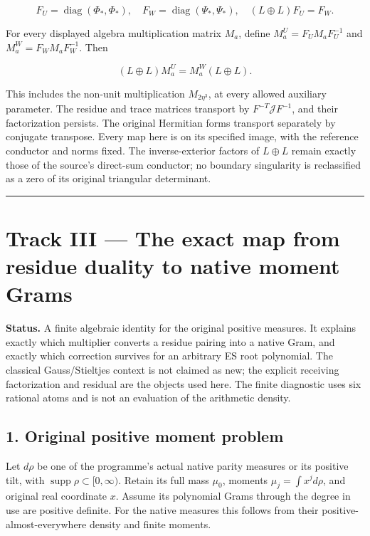 \[
 F_U=\operatorname{diag}(\Phi_*,\Phi_*),\quad
 F_W=\operatorname{diag}(\Psi_*,\Psi_*),\quad
 (L\oplus L)F_U=F_W.
\]

For every displayed algebra multiplication matrix \(M_a\), define
\(M_a^U=F_U M_a F_U^{-1}\) and \(M_a^W=F_W M_a F_W^{-1}\). Then

\[
 (L\oplus L)M_a^U=M_a^W(L\oplus L).
\]

This includes the non-unit multiplication \(M_{2\eta^3}\), at every
allowed auxiliary parameter. The residue and trace matrices transport by
\(F^{-T}\mathcal JF^{-1}\), and their factorization persists. The
original Hermitian forms transport separately by conjugate transpose.
Every map here is on its specified image, with the reference conductor
and norms fixed. The inverse-exterior factors of \(L\oplus L\) remain
exactly those of the source's direct-sum conductor; no boundary
singularity is reclassified as a zero of its original triangular
determinant.

\begin{center}\rule{0.5\linewidth}{0.5pt}\end{center}

\section{Track III --- The exact map from residue duality to native
moment
Grams}\label{track-iii-the-exact-map-from-residue-duality-to-native-moment-grams}

\textbf{Status.} A finite algebraic identity for the original positive
measures. It explains exactly which multiplier converts a residue
pairing into a native Gram, and exactly which correction survives for an
arbitrary ES root polynomial. The classical Gauss/Stieltjes context is
not claimed as new; the explicit receiving factorization and residual
are the objects used here. The finite diagnostic uses six rational atoms
and is not an evaluation of the arithmetic density.

\subsection{1. Original positive moment
problem}\label{original-positive-moment-problem}

Let \(d\rho\) be one of the programme's actual native parity measures or
its positive tilt, with \(\operatorname{supp}\rho\subset[0,\infty)\).
Retain its full mass \(\mu_0\), moments \(\mu_j=\int x^j d\rho\), and
original real coordinate \(x\). Assume its polynomial Grams through the
degree in use are positive definite. For the native measures this
follows from their positive-almost-everywhere density and finite
moments.

